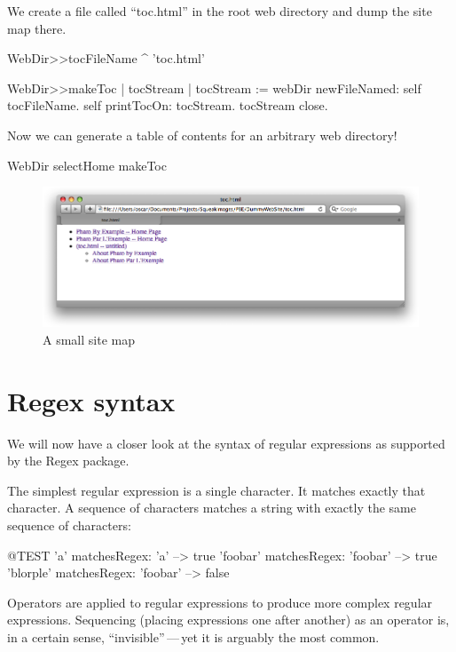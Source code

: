 \documentclass[a4paper,10pt,twoside]{book}
\begin{document}
We create a file called ``toc.html'' in the root web directory and dump the site map there.
\begin{code}{}
WebDir>>tocFileName
	^ 'toc.html'

WebDir>>makeToc
	| tocStream |
	tocStream := webDir newFileNamed: self tocFileName.
	self printTocOn: tocStream.
	tocStream close.
\end{code}

Now we can generate a table of contents for an arbitrary web directory!
\begin{code}{}
WebDir selectHome makeToc
\end{code}

\begin{figure}[tbh]
\begin{center}
\includegraphics[width=\textwidth]{PBE-toc}
\caption{A small site map}
\end{center}
\end{figure}

\section{Regex syntax}

We will now have a closer look at the syntax of regular expressions as supported by the Regex package.

The simplest regular expression is a single character.  It matches exactly that character. A sequence of characters matches a string with exactly the same sequence of characters:
\begin{code}{@TEST}
'a' matchesRegex: 'a'                  --> true
'foobar' matchesRegex: 'foobar'  --> true
'blorple' matchesRegex: 'foobar' --> false
\end{code}

Operators are applied to regular expressions to
produce more complex regular expressions. Sequencing (placing expressions one
after another) as an operator is, in a certain sense, ``invisible''\,---\,yet it is
arguably the most common.
\end{document}
